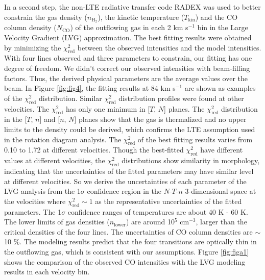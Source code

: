 In a second step, the non-LTE radiative transfer code RADEX \citep{2007A&A...468..627V} was used to better constrain the gas density ($n_{\mathrm{H}_2}$), the kinetic temperature ($T_{\mathrm{kin}}$) and the CO column density ($N_{\mathrm{CO}}$) of the outflowing gas in each 2 km s$^{-1}$ bin in the Large Velocity Gradient (LVG) approximation. The best fitting results were obtained by minimizing the $\chi^2_{\mathrm{red}}$ between the observed intensities and the model intensities. With four lines observed and three parameters to constrain, our fitting has one degree of freedom. We didn't correct our observed intensities with beam-filling factors. Thus, the derived physical parameters are the average values over the beam.  In Figure \ref{fig:fig4}, the fitting results at 84 km s$^{-1}$ are shown as examples of the $\chi^2_{\mathrm{red}}$ distribution. Similar $\chi^2_{\mathrm{red}}$ distribution profiles were found at other velocities. The $\chi^2_{\mathrm{red}}$ has only one minimum in [$T$, $N$] planes. The $\chi^2_{\mathrm{red}}$ distribution in the [$T$, $n$] and [$n$, $N$] planes show that the gas is thermalized and no upper limits to the density could be derived, which confirms the LTE assumption used in the rotation diagram analysis. The $\chi^2_{\mathrm{red}}$ of the best fitting results varies from 0.10 to 1.72 at different velocities. Though the best-fitted $\chi^2_{\mathrm{red}}$ have different values at different velocities, the $\chi^2_{\mathrm{red}}$ distributions show similarity in morphology, indicating that the uncertainties of the fitted parameters may have similar level at different velocities. So we derive the uncertainties of each parameter of the LVG analysis from the 1$\sigma$ confidence region in the $N$-$T$-$n$ 3-dimensional space at the velocities where $\chi^2_{\mathrm{red}} \sim 1$ as the representative uncertainties of the fitted parameters. The 1$\sigma$ confidence ranges of temperatures are about 40 K - 60 K. The lower limits of gas densities ($n_{\mathrm{lower}}$) are around 10$^5$ cm$^{-3}$, larger than the critical densities of the four lines. The uncertainties of CO column densities are $\sim$ 10 \%. The modeling results predict that the four transitions are optically thin in the outflowing gas, which is consistent with our assumptions. Figure \ref{fig:figa1} shows the comparison of the observed CO intensities with the LVG modeling results in each velocity bin. 

